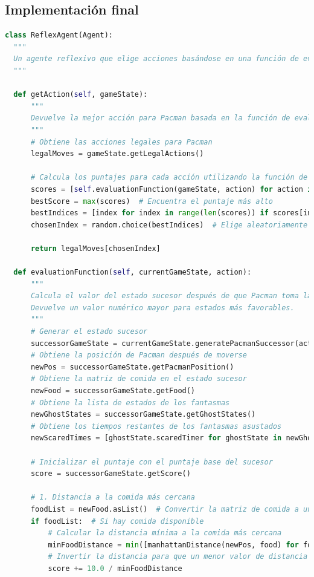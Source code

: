 \documentclass{report}
\begin{document}
        \subsection{Implementación final}
          \begin{lstlisting}[language=Python, caption=Implementación final del agente reflex]
class ReflexAgent(Agent):
  """
  Un agente reflexivo que elige acciones basándose en una función de evaluación.
  """

  def getAction(self, gameState):
      """
      Devuelve la mejor acción para Pacman basada en la función de evaluación.
      """
      # Obtiene las acciones legales para Pacman
      legalMoves = gameState.getLegalActions()

      # Calcula los puntajes para cada acción utilizando la función de evaluación
      scores = [self.evaluationFunction(gameState, action) for action in legalMoves]
      bestScore = max(scores)  # Encuentra el puntaje más alto
      bestIndices = [index for index in range(len(scores)) if scores[index] == bestScore]
      chosenIndex = random.choice(bestIndices)  # Elige aleatoriamente entre las mejores acciones

      return legalMoves[chosenIndex]

  def evaluationFunction(self, currentGameState, action):
      """
      Calcula el valor del estado sucesor después de que Pacman toma la acción `action`.
      Devuelve un valor numérico mayor para estados más favorables.
      """
      # Generar el estado sucesor
      successorGameState = currentGameState.generatePacmanSuccessor(action)
      # Obtiene la posición de Pacman después de moverse
      newPos = successorGameState.getPacmanPosition()
      # Obtiene la matriz de comida en el estado sucesor
      newFood = successorGameState.getFood()
      # Obtiene la lista de estados de los fantasmas
      newGhostStates = successorGameState.getGhostStates()
      # Obtiene los tiempos restantes de los fantasmas asustados
      newScaredTimes = [ghostState.scaredTimer for ghostState in newGhostStates]

      # Inicializar el puntaje con el puntaje base del sucesor
      score = successorGameState.getScore()

      # 1. Distancia a la comida más cercana
      foodList = newFood.asList()  # Convertir la matriz de comida a una lista de posiciones
      if foodList:  # Si hay comida disponible
          # Calcular la distancia mínima a la comida más cercana
          minFoodDistance = min([manhattanDistance(newPos, food) for food in foodList])
          # Invertir la distancia para que un menor valor de distancia dé un mayor puntaje
          score += 10.0 / minFoodDistance


\end{lstlisting}
\end{document}
